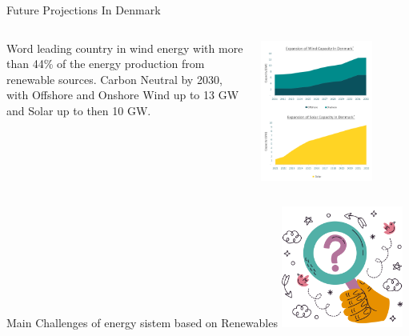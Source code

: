 \documentclass[aspectratio=169,hyperref={pdfpagelabels=false}]{beamer}
\begin{document}
\begin{frame}{Future Projections In Denmark}

        \begin{columns}
          \begin{column}{0.4\textwidth}
            Word leading country in wind energy with more than 44\% of the energy production from renewable sources.
            Carbon Neutral by 2030, with Offshore and Onshore Wind up to 13 GW and Solar up to then 10 GW.
            
          \end{column}
      
          \begin{column}{0.5\textwidth}
            \includegraphics[width=0.75\textwidth]{img/pic2.png} %
          \end{column}
        \end{columns}
      \end{frame}

\begin{frame}{Main Challenges of energy sistem based on Renewables}
\includegraphics[width=0.3\textwidth]{img/pic5.png} \centering
\end{frame}
        
\end{document}
